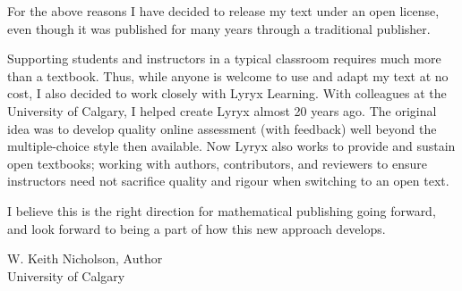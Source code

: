For the above reasons I have decided to release my text under an open license, even though
it was published for many years through a traditional publisher.

Supporting students and instructors in a typical classroom requires much more than a
textbook. Thus, while anyone is welcome to use and adapt my text at no cost, I also
decided to work closely with Lyryx Learning. With colleagues at the University of Calgary,
I helped create Lyryx almost 20 years ago. The original idea was to develop quality online
assessment (with feedback) well beyond the multiple-choice style then available. Now Lyryx
also works to provide and sustain open textbooks; working with authors, contributors, and
reviewers to ensure instructors need not sacrifice quality and rigour when switching to an
open text.

I believe this is the right direction for mathematical publishing going forward, and look
forward to being a part of how this new approach develops.

\medskip

\noindent W. Keith Nicholson, Author \\
\noindent University of Calgary


